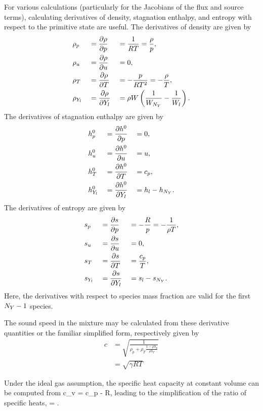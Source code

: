 For various calculations (particularly for the Jacobians of the flux and source terms), calculating derivatives of density, stagnation enthalpy, and entropy with respect to the primitive state are useful. The derivatives of density are given by
\begin{alignat}{3}
    &\rho_p &&= \frac{\partial \rho}{\partial p} &&= \frac{1}{RT} = \frac{\rho}{p}, \\
    &\rho_u &&= \frac{\partial \rho}{\partial u} &&= 0, \\
    &\rho_T &&= \frac{\partial \rho}{\partial T} &&= -\frac{p}{RT^2} = -\frac{\rho}{T}, \\
    &\rho_{Y_{l}} &&= \frac{\partial \rho}{\partial Y_{l}} &&= \rho W \left( \frac{1}{W_{{N_Y}}} - \frac{1}{W_{l}} \right).
\end{alignat}
The derivatives of stagnation enthalpy are given by
\begin{alignat}{3}
    &h^0_p &&= \frac{\partial h^0}{\partial p} &&= 0, \\
    &h^0_u &&= \frac{\partial h^0}{\partial u} &&= u, \\ 
    &h^0_T &&= \frac{\partial h^0}{\partial T} &&= c_p, \\
    &h^0_{Y_{l}} &&= \frac{\partial h^0}{\partial Y_{l} } &&= h_{l} - h_{{N_Y}}. 
\end{alignat}
The derivatives of entropy are given by
\begin{alignat}{3}
    &s_p &&= \frac{\partial s}{\partial p} &&= -\frac{R}{p} = -\frac{1}{\rho T}, \\
    &s_u &&= \frac{\partial s}{\partial u} &&= 0, \\
    &s_T &&= \frac{\partial s}{\partial T} &&= \frac{c_p}{T}, \\
    &s_{Y_{l}} &&= \frac{\partial s}{\partial Y_{l}} &&= s_{l} - s_{{N_Y}}. 
\end{alignat}
Here, the derivatives with respect to species mass fraction are valid for the first ${N_Y}-1$ species.

The sound speed in the mixture may be calculated from these derivative quantities or the familiar simplified form, respectively given by
\begin{align}
    c &= \sqrt{\frac{1}{\rho_p + \rho_T \frac{1 - \rho h_p}{\rho h_T}}} \\
    & = \sqrt{\gamma R T}
\end{align}

Under the ideal gas assumption, the specific heat capacity at constant volume can be computed from
\be
    c_v = c_p - R,
\ee
leading to the simplification of the ratio of specific heats,
\be
    \gamma = .
\ee


